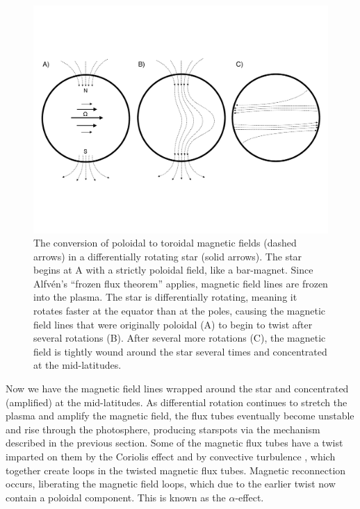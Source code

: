 \begin{figure}
\centering
\includegraphics[scale=0.55]{intro/alpha_omega.pdf}
\caption{The conversion of poloidal to toroidal magnetic fields (dashed arrows) in a differentially rotating star (solid arrows). The star begins at A with a strictly poloidal field, like a bar-magnet. Since Alfv{\'e}n's ``frozen flux theorem''  applies, magnetic field lines are frozen into the plasma. The star is differentially rotating, meaning it rotates faster at the equator than at the poles, causing the magnetic field lines that were originally poloidal (A) to begin to twist after several rotations (B). After several more rotations (C), the magnetic field is tightly wound around the star several times and concentrated at the mid-latitudes. } \label{fig:alpha_omega}
\end{figure}

Now we have the magnetic field lines wrapped around the star and concentrated (amplified) at the mid-latitudes. As differential rotation continues to stretch the plasma and amplify the magnetic field, the flux tubes eventually become unstable and rise through the photosphere, producing starspots via the mechanism described in the previous section. Some of the magnetic flux tubes have a twist imparted on them by the Coriolis effect and by convective turbulence \citep{Parker1955a, Parker1955b}, which together create loops in the twisted magnetic flux tubes. Magnetic reconnection occurs, liberating the magnetic field loops, which due to the earlier twist now contain a poloidal component. This is known as the $\alpha$-effect. 

